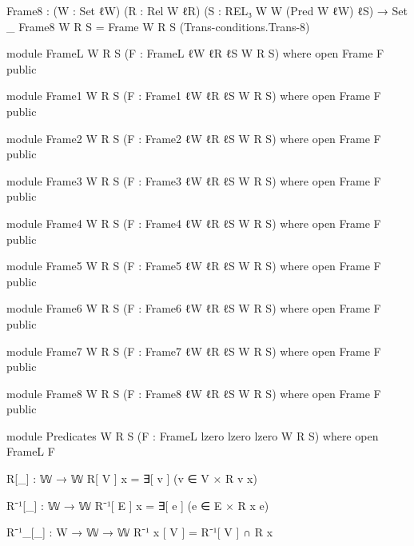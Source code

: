 \begin{spverbatim}
Frame8 : (W : Set ℓW) (R : Rel W ℓR) (S : REL₃ W W (Pred W ℓW) ℓS) → Set _
Frame8 W R S = Frame W R S (Trans-conditions.Trans-8)

module FrameL
  {W R S}
  (F : FrameL {ℓW} {ℓR} {ℓS} W R S) where
  open Frame F public

module Frame1
  {W R S}
  (F : Frame1 {ℓW} {ℓR} {ℓS} W R S) where
  open Frame F public

module Frame2
  {W R S}
  (F : Frame2 {ℓW} {ℓR} {ℓS} W R S) where
  open Frame F public

module Frame3
  {W R S}
  (F : Frame3 {ℓW} {ℓR} {ℓS} W R S) where
  open Frame F public

module Frame4
  {W R S}
  (F : Frame4 {ℓW} {ℓR} {ℓS} W R S) where
  open Frame F public

module Frame5
  {W R S}
  (F : Frame5 {ℓW} {ℓR} {ℓS} W R S) where
  open Frame F public

module Frame6
  {W R S}
  (F : Frame6 {ℓW} {ℓR} {ℓS} W R S) where
  open Frame F public

module Frame7
  {W R S}
  (F : Frame7 {ℓW} {ℓR} {ℓS} W R S) where
  open Frame F public

module Frame8
  {W R S}
  (F : Frame8 {ℓW} {ℓR} {ℓS} W R S) where
  open Frame F public

module Predicates
  {W R S}
  (F : FrameL {lzero} {lzero} {lzero} W R S)
  where
  open FrameL F

  R[_] : 𝕎 → 𝕎
  R[ V ] x = ∃[ v ] (v ∈ V × R v x)

  R⁻¹[_] : 𝕎 → 𝕎
  R⁻¹[ E ] x = ∃[ e ] (e ∈ E × R x e)

  R⁻¹_[_] : W → 𝕎 → 𝕎
  R⁻¹ x [ V ] = R⁻¹[ V ] ∩ R x
\end{spverbatim}
